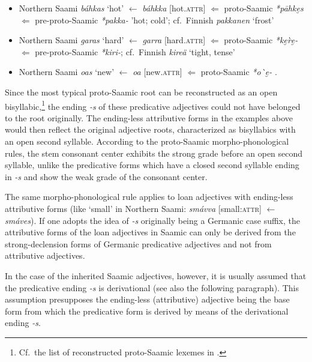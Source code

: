 {\begin{itemize}
\item Northern Saami \textit{báhkas} ‘hot’ $\leftarrow$ \textit{báhkka} [hot.\textsc{attr}] $\Leftarrow$ proto-Saamic \textit{*pāhke̮s} $\Leftarrow$ pre-proto-Saamic \textit{*pakka-} 'hot; cold’; cf.~Finnish \textit{pakkanen} ‘frost’ \cite[230]{sammallahti1998b}
\item Northern Saami \textit{garas} ‘hard’ $\leftarrow$ \textit{garra} [hard.\textsc{attr}] $\Leftarrow$ proto-Saamic \textit{*ke̮\`re̮-} $\Leftarrow$ pre-proto-Saamic \textit{*kiri-}; cf.~Finnish \textit{kireä} ‘tight, tense’ \cite[242]{sammallahti1998b}
\item Northern Saami \textit{o{\dj}as} ‘new’ $\leftarrow$ \textit{o{\dj}{\dj}a} [new.\textsc{attr}] $\Leftarrow$ proto-Saamic \textit{*o\`{\dh}e̮-} \cite[258]{sammallahti1998b}.
\end{itemize}

\noindent Since the most typical proto-Saamic root can be reconstructed as an open bisyllabic,\footnote{Cf.~the list of reconstructed proto-Saamic lexemes in \cite{lehtiranta1989}.} the ending \textit{-s} of these predicative adjectives could not have belonged to the root originally. The ending-less attributive forms in the examples above would then reflect the original adjective roots, characterized as bisyllabics with an open second syllable. According to the proto-Saamic morpho-phonological rules, the stem consonant center exhibits the strong grade before an open second syllable, unlike the predicative forms which have a closed second syllable ending in \textit{-s} and show the weak grade of the consonant center.

The same morpho-phonological rule applies to loan adjectives with ending-less attributive forms (like ‘small’ in Northern Saami: \textit{smávva} [small:\textsc{attr}] $\leftarrow$ \textit{smáves}). If one adopts the idea of \textit{-s} originally being a Germanic case suffix, the attributive forms of the loan adjectives in Saamic can only be derived from the strong-declension forms of Germanic predicative adjectives and not from attributive adjectives.

In the case of the inherited Saamic adjectives, however, it is usually assumed that the predicative ending \textit{-s} is derivational (see also the following paragraph). This assumption presupposes the ending-less (attributive) adjective being the base form from which the predicative form is derived by means of the derivational ending \textit{-s}. %

}
